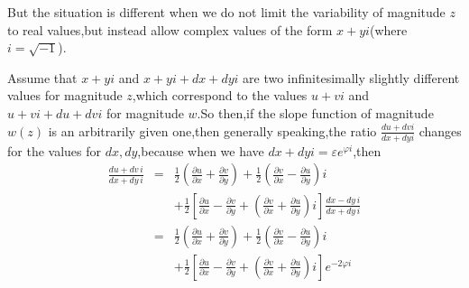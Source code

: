 \documentclass{amsart}
\theoremstyle{plain}
\theoremstyle{definition}
\begin{document}
But the situation is different when we do not limit the variability of
magnitude $z$ to real values,but instead allow complex values of the
form $x+yi$(where $i=\sqrt{-1}$).

Assume that $x+yi$ and $x+yi+dx+dyi$ are two infinitesimally slightly
different values for magnitude $z$,which correspond to the values
$u+vi$ and $u+vi+du+dvi$ for magnitude {\color{green}$w$}.So then,if
the slope function of magnitude $w(z)$ is an arbitrarily given
one,then generally speaking,the ratio $\frac{du+dvi}{dx+dyi}$ changes
for the values for $dx,dy$,because when we have $dx+dyi=\varepsilon
e^{\varphi i}$,then
\begin{eqnarray*}
  \frac{du + dv \, i}{dx + dy \, i}
  &=&   \frac{1}{2}
  \left(
    \frac{\partial u}{\partial x}
    + \frac{\partial v}{\partial y}
  \right)
  + \frac{1}{2}
  \left(
    \frac{\partial v}{\partial x}
    - \frac{\partial u}{\partial y}
  \right) i \\
  & & + \frac{1}{2}
  \left[
    \frac{\partial u}{\partial x}
    - \frac{\partial v}{\partial y}
    + \left(
      \frac{\partial v}{\partial x}
      + \frac{\partial u}{\partial y}
    \right) i
  \right]
  \frac{dx - dy \, i}{dx + dy \, i} \\
  &=&   \frac{1}{2}
  \left(
    \frac{\partial u}{\partial x}
    + \frac{\partial v}{\partial y}
  \right)
  + \frac{1}{2}
  \left(
    \frac{\partial v}{\partial x}
    - \frac{\partial u}{\partial y}
  \right) i \\
  & & + \frac{1}{2}
  \left[
    \frac{\partial u}{\partial x}
    - \frac{\partial v}{\partial y}
    + \left(
      \frac{\partial v}{\partial x}
      + \frac{\partial u}{\partial y}
    \right) i
  \right]
  e^{-2 \varphi i}
\end{eqnarray*}
\end{document}
